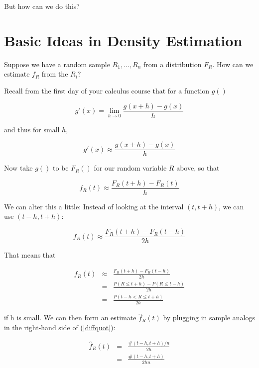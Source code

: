 But how can we do this?

\section{Basic Ideas in Density Estimation}

Suppose we have a random sample $R_1,...,R_n$ from a distribution $F_R$.
How can we estimate $f_R$ from the $R_i$?

Recall from the first day of your calculus course that for a function
$g()$

\begin{equation}
g'(x) = \lim_{h \rightarrow 0} \frac{g(x+h) - g(x)}{h}
\end{equation}

and thus for small $h$,

\begin{equation}
g'(x) \approx \frac{g(x+h) - g(x)}{h}
\end{equation}

Now take $g()$ to be $F_R()$ for our random variable $R$ above, so that 

\begin{equation}
f_R(t) \approx \frac{F_R(t+h) - F_R(t)}{h}
\end{equation}

We can alter this a little:  Instead of looking at the interval
$(t,t+h)$, we can use $(t-h,t+h)$:

\begin{equation}
f_R(t) \approx \frac{F_R(t+h) - F_R(t-h)}{2h}
\end{equation}

That means that

\begin{eqnarray}
\label{diffquot}
f_R(t) &\approx& \frac{F_R(t+h) - F_R(t-h)}{2h} \\
&=& \frac{P(R \leq t+h) - P(R \leq t-h)}{2h} \\
&=& \frac{P(t-h < R \leq t+h)}{2h}
\end{eqnarray}

if h is small.  We can then form an estimate $\widehat{f}_R(t)$ by plugging
in sample analogs in the right-hand side of (\ref{diffquot}):

\begin{eqnarray}
\widehat{f}_R(t) &=& \frac{\#(t-h,t+h)/n}{2h} \\ 
&=& \frac{\#(t-h,t+h)}{2hn}  
\label{prehisto}
\end{eqnarray}

